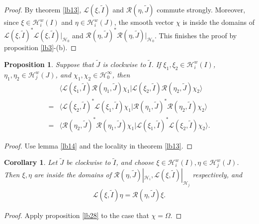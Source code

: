 \documentclass[12pt,a4paper]{article}
\theoremstyle{definition}
\theoremstyle{plain}
\newtheorem{pp}[df]{Proposition}
\newtheorem{co}[df]{Corollary}
\newcommand{\mc}{\mathcal}
\newcommand{\wtd}{\widetilde}
\newcommand{\bk}[1]{\langle {#1}\rangle}
\newcommand{\scr}{\mathscr}
\numberwithin{equation}{subsection}
\begin{document}
\begin{proof}
By theorem \ref{lb13}, $\scr L(\xi,\wtd I)$ and $\scr R(\eta,\wtd J)$ commute strongly. Moreover, since $\xi\in\mc H_i^w(I)$ and $\eta\in\mc H_i^w(J)$, the smooth vector $\chi$ is inside the domains of $\scr L(\xi,\wtd I)^*\scr L(\xi,\wtd I)|_{\mc H_0}$ and $\scr R(\eta,\wtd J)^*\scr R(\eta,\wtd J)|_{\mc H_0}$. This finishes the proof by proposition \ref{lb3}-(b).
\end{proof}


\begin{pp}\label{lb26}
	Suppose that $\wtd J$ is clockwise to $\wtd I$. If $\xi_1,\xi_2\in\mc H_i^w(I)$, $\eta_1,\eta_2\in\mc H_j^w(J)$, and $\chi_1,\chi_2\in\mc H_0^\infty$, then 
	\begin{align}
	&\bk{\scr L(\xi_1,\wtd I)\scr R(\eta_1,\wtd J)\chi_1|\scr L(\xi_2,\wtd I)\scr R(\eta_2,\wtd J)\chi_2}\nonumber\\
	=&\bk{\scr L(\xi_2,\wtd I)^*\scr L(\xi_1,\wtd I)\chi_1|\scr R(\eta_1,\wtd J)^*\scr R(\eta_2,\wtd I)\chi_2}\nonumber\\
	=&\bk{\scr R(\eta_2,\wtd J)^*\scr R(\eta_1,\wtd J)\chi_1|\scr L(\xi_1,\wtd I)^*\scr L(\xi_2,\wtd I)\chi_2}.
	\end{align}
\end{pp}

\begin{proof}
	Use lemma \ref{lb14} and the locality in theorem \ref{lb13}.
\end{proof}

\begin{co}\label{lb75}
Let $\wtd J$ be clockwise to $\wtd I$, and choose $\xi\in\mc H_i^w(I),\eta\in\mc H_j^w(J)$. Then $\xi,\eta$ are inside the domains of $\scr R(\eta,\wtd J)|_{\mc H_i},\scr L(\xi,\wtd I)|_{\mc H_j}$ respectively, and
\begin{align}\label{eq18}
\scr L(\xi,\wtd I)\eta=\scr R(\eta,\wtd J)\xi.
\end{align}
\end{co}
\begin{proof}
Apply proposition \ref{lb28} to the case that  $\chi=\Omega$.
\end{proof}
\end{document}
